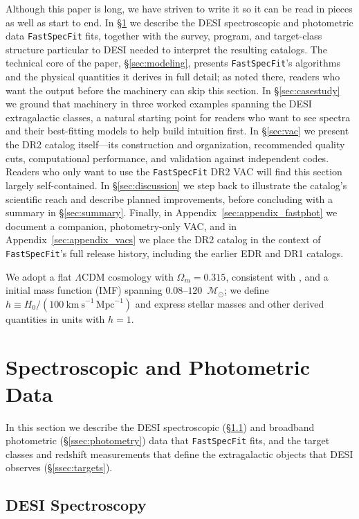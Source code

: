 \documentclass[modern,linenumbers]{aastex702}
\newcommand{\fastspecfit}{\texttt{FastSpecFit}}
\newcommand{\kms}{\ensuremath{\mathrm{km~s}^{-1}}}
\newcommand{\msun}{\ensuremath{\mathcal{M}_{\odot}}}
\begin{document}
Although this paper is long, we have striven to write it so it can be
read in pieces as well as start to end. In \S\ref{sec:data} we
describe the DESI spectroscopic and photometric data \fastspecfit{}
fits, together with the survey, program, and target-class structure
particular to DESI needed to interpret the resulting catalogs. The
technical core of the paper, \S\ref{sec:modeling}, presents
\fastspecfit{}'s algorithms and the physical quantities it derives in
full detail; as noted there, readers who want the output before the
machinery can skip this section. In \S\ref{sec:casestudy} we ground
that machinery in three worked examples spanning the DESI
extragalactic classes, a natural starting point for readers who want
to see spectra and their best-fitting models to help build
intuition first. In \S\ref{sec:vac} we present the DR2 catalog
itself---its construction and organization, recommended quality cuts,
computational performance, and validation against independent
codes. Readers who only want to use the \fastspecfit{} DR2 VAC will
find this section largely self-contained. In \S\ref{sec:discussion} we
step back to illustrate the catalog's scientific reach and describe
planned improvements, before concluding with a summary in
\S\ref{sec:summary}. Finally, in Appendix~\ref{sec:appendix_fastphot}
we document a companion, photometry-only VAC, and in
Appendix~\ref{sec:appendix_vacs} we place the DR2 catalog in the
context of \fastspecfit{}'s full release history, including the
earlier EDR and DR1 catalogs.

We adopt a flat $\Lambda$CDM cosmology with $\Omega_m = 0.315$,
consistent with \citet{planck-collaboration20a}, and a
\citet{chabrier03a} initial mass function (IMF) spanning
$0.08$--$120$~\msun; we define $h \equiv H_0 / (100~\kms\,\textrm{Mpc}^{-1})$
and express stellar masses and other derived quantities
in units with $h=1$.

\section{Spectroscopic and Photometric Data}
\label{sec:data}

In this section we describe the DESI spectroscopic
(\S\ref{ssec:spectra}) and broadband photometric
(\S\ref{ssec:photometry}) data that \fastspecfit{} fits, and the
target classes and redshift measurements that define the extragalactic
objects that DESI observes (\S\ref{ssec:targets}).

\subsection{DESI Spectroscopy}
\label{ssec:spectra}
\end{document}
